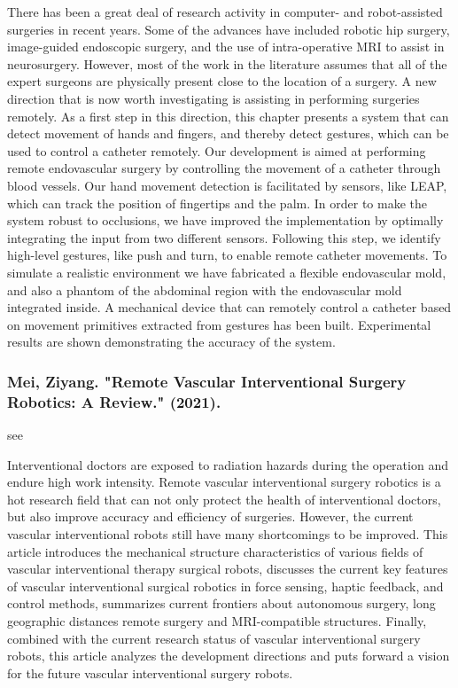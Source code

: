 \documentclass[conference]{IEEEtran}
\begin{document}
There has been a great deal of research activity in computer- and robot-assisted surgeries in recent years. Some of the advances have included robotic hip surgery, image-guided endoscopic surgery, and the use of intra-operative MRI to assist in neurosurgery. However, most of the work in the literature assumes that all of the expert surgeons are physically present close to the location of a surgery. A new direction that is now worth investigating is assisting in performing surgeries remotely. As a first step in this direction, this chapter presents a system that can detect movement of hands and fingers, and thereby detect gestures, which can be used to control a catheter remotely. Our development is aimed at performing remote endovascular surgery by controlling the movement of a catheter through blood vessels. Our hand movement detection is facilitated by sensors, like LEAP, which can track the position of fingertips and the palm. In order to make the system robust to occlusions, we have improved the implementation by optimally integrating the input from two different sensors. Following this step, we identify high-level gestures, like push and turn, to enable remote catheter movements. To simulate a realistic environment we have fabricated a flexible endovascular mold, and also a phantom of the abdominal region with the endovascular mold integrated inside. A mechanical device that can remotely control a catheter based on movement primitives extracted from gestures has been built. Experimental results are shown demonstrating the accuracy of the system.

\medskip
\subsubsection{Mei, Ziyang. "Remote Vascular Interventional Surgery Robotics: A Review." (2021).}
see \cite{mei2021remote}

Interventional doctors are exposed to radiation hazards during the operation and endure high work intensity. Remote vascular interventional surgery robotics is a hot research field that can not only protect the health of interventional doctors, but also improve accuracy and efficiency of surgeries. However, the current vascular interventional robots still have many shortcomings to be improved. This article introduces the mechanical structure characteristics of various fields of vascular interventional therapy surgical robots, discusses the current key features of vascular interventional surgical robotics in force sensing, haptic feedback, and control methods, summarizes current frontiers about autonomous surgery, long geographic distances remote surgery and MRI-compatible structures. Finally, combined with the current research status of vascular interventional surgery robots, this article analyzes the development directions and puts forward a vision for the future vascular interventional surgery robots.
\end{document}
